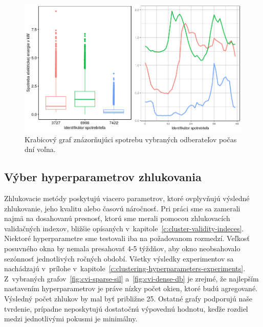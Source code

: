 \documentclass[a4paper,twoside,slovak,12pt,appendix]{article}
\begin{document}
\begin{figure}[htbp]
  \centering
  \includegraphics[width=\textwidth]{holidays_plot.png}
  \caption{Krabicový graf znázorňujúci spotrebu vybraných odberateľov počas dní voľna.}
  \label{fig:holidays_plot}
\end{figure}

\subsection{Výber hyperparametrov zhlukovania}
Zhlukovacie metódy poskytujú viacero parametrov, ktoré ovplyvňujú výsledné
zhlukovanie, jeho kvalitu alebo časovú náročnosť. Pri práci sme sa zamerali
najmä na dosahovanú presnosť, ktorú sme merali pomocou zhlukovacích validačných
indexov, bližšie opísaných v~kapitole~\ref{c:cluster-validity-indeces}. Niektoré
hyperparametre sme testovali iba na požadovanom rozmedzí. Veľkosť posuvného okna
by nemala presahovať 4-5 týždňov, aby okno neobsahovalo sezónnosť jednotlivých
ročných období. Všetky výsledky experimentov sa nachádzajú v~prílohe
v~kapitole~\ref{c:clustering-hyperparameters-experiments}. Z~vybraných
grafov~\ref{fig:cvi-sparse-sil} a~\ref{fig:cvi-dense-db} je zrejmé, že najlepším
nastavením hyperparametrov je práve nízky počet okien, ktoré budú agregované.
Výsledný počet zhlukov by mal byť približne 25. Ostatné grafy podporujú naše
tvrdenie, prípadne neposkytujú dostatočnú výpovednú hodnotu, keďže rozdiel
medzi jednotlivými pokusmi je minimálny.
\end{document}
